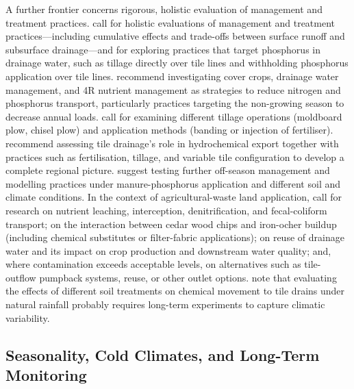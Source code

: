A further frontier concerns rigorous, holistic evaluation of management and treatment practices. \textcite{King2015} call for holistic evaluations of management and treatment practices---including cumulative effects and trade-offs between surface runoff and subsurface drainage---and for exploring practices that target phosphorus in drainage water, such as tillage directly over tile lines and withholding phosphorus application over tile lines. \textcite{King2016} recommend investigating cover crops, drainage water management, and 4R nutrient management as strategies to reduce nitrogen and phosphorus transport, particularly practices targeting the non-growing season to decrease annual loads. \textcite{Williams2016} call for examining different tillage operations (moldboard plow, chisel plow) and application methods (banding or injection of fertiliser). \textcite{Kokulan2021} recommend assessing tile drainage's role in hydrochemical export together with practices such as fertilisation, tillage, and variable tile configuration to develop a complete regional picture. \textcite{Qi2018} suggest testing further off-season management and modelling practices under manure-phosphorus application and different soil and climate conditions. In the context of agricultural-waste land application, \textcite{BACKLUND1995} call for research on nutrient leaching, interception, denitrification, and fecal-coliform transport; on the interaction between cedar wood chips and iron-ocher buildup (including chemical substitutes or filter-fabric applications); on reuse of drainage water and its impact on crop production and downstream water quality; and, where contamination exceeds acceptable levels, on alternatives such as tile-outflow pumpback systems, reuse, or other outlet options. \textcite{Fortin2002} note that evaluating the effects of different soil treatments on chemical movement to tile drains under natural rainfall probably requires long-term experiments to capture climatic variability.

\subsection{Seasonality, Cold Climates, and Long-Term Monitoring}

